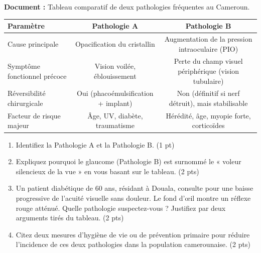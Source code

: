 \documentclass[11pt]{article}
\begin{document}
\begin{exercice}
    \textbf{Document :} Tableau comparatif de deux pathologies fréquentes au Cameroun.
    \begin{center}
    \begin{tabular}{|l|c|c|}
    \hline
    \textbf{Paramètre} & \textbf{Pathologie A} & \textbf{Pathologie B} \\
    \hline
    Cause principale & Opacification du cristallin & Augmentation de la pression intraoculaire (PIO) \\
    \hline
    Symptôme fonctionnel précoce & Vision voilée, éblouissement & Perte du champ visuel périphérique (vision tubulaire) \\
    \hline
    Réversibilité chirurgicale & Oui (phacoémulsification + implant) & Non (définitif si nerf détruit), mais stabilisable \\
    \hline
    Facteur de risque majeur & Âge, UV, diabète, traumatisme & Hérédité, âge, myopie forte, corticoïdes \\
    \hline
    \end{tabular}
    \end{center}
    \begin{enumerate}
        \item Identifiez la Pathologie A et la Pathologie B. (1 pt)
        \item Expliquez pourquoi le glaucome (Pathologie B) est surnommé le « voleur silencieux de la vue » en vous basant sur le tableau. (2 pts)
        \item Un patient diabétique de 60 ans, résidant à Douala, consulte pour une baisse progressive de l'acuité visuelle sans douleur. Le fond d'œil montre un réflexe rouge atténué. Quelle pathologie suspectez-vous ? Justifiez par deux arguments tirés du tableau. (2 pts)
        \item Citez deux mesures d'hygiène de vie ou de prévention primaire pour réduire l'incidence de ces deux pathologies dans la population camerounaise. (2 pts)
    \end{enumerate}
\end{exercice}
\end{document}
